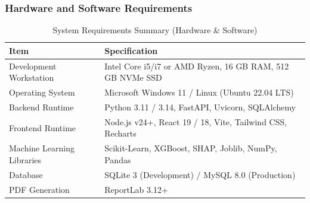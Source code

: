 \documentclass[12pt,a4paper]{article}
\begin{document}
\subsubsection{Hardware and Software Requirements}
\begin{table}[H]
\centering
\small
\caption{System Requirements Summary (Hardware \& Software)}
\begin{tabularx}{\linewidth}{|L{4.2cm}|Y|}
\hline
\textbf{Item} & \textbf{Specification} \\ \hline
Development Workstation & Intel Core i5/i7 or AMD Ryzen, 16 GB RAM, 512 GB NVMe SSD \\ \hline
Operating System & Microsoft Windows 11 / Linux (Ubuntu 22.04 LTS) \\ \hline
Backend Runtime & Python 3.11 / 3.14, FastAPI, Uvicorn, SQLAlchemy \\ \hline
Frontend Runtime & Node.js v24+, React 19 / 18, Vite, Tailwind CSS, Recharts \\ \hline
Machine Learning Libraries & Scikit-Learn, XGBoost, SHAP, Joblib, NumPy, Pandas \\ \hline
Database & SQLite 3 (Development) / MySQL 8.0 (Production) \\ \hline
PDF Generation & ReportLab 3.12+ \\ \hline
\end{tabularx}
\label{tab:system_requirements}
\end{table}
\end{document}

